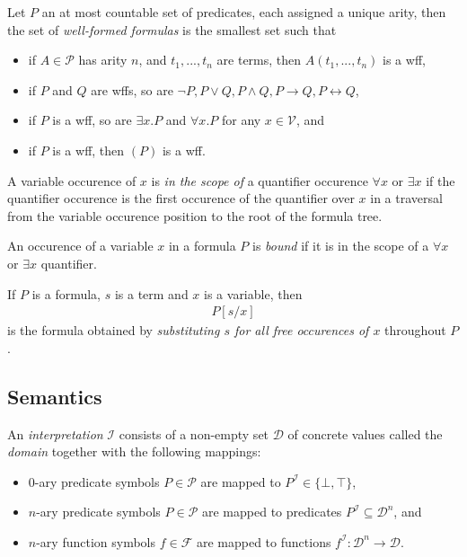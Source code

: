 \documentclass{article}
\begin{document}
\begin{definition}
	Let $P$ an at most countable set of predicates, each assigned a unique arity,
	then the set of \emph{well-formed formulas} is the smallest set such that
	\begin{itemize}
		\item if $A\in \mathcal{P}$ has arity $n$, and $t_1,...,t_n$ are terms, then $A(t_1, ..., t_n)$ is a wff,
		\item if $P$ and $Q$ are wffs, so are $\neg P,P\vee Q,P\wedge Q,P\rightarrow Q,P\leftrightarrow Q$,
		\item if $P$ is a wff, so are $\exists x. P$ and $\forall x. P$ for any $x\in \mathcal{V}$, and
		\item if $P$ is a wff, then $(P)$ is a wff.
	\end{itemize}
\end{definition}

\begin{definition}
	A variable occurence of $x$ is \emph{in the scope of} a quantifier
	occurence $\forall x$ or $\exists x$ if the quantifier occurence is
	the first occurence of the quantifier over $x$ in a traversal from the
	variable occurence position to the root of the formula tree.

	An occurence of a variable $x$ in a formula $P$ is \emph{bound} if it
	is in the scope of a $\forall x$ or $\exists x$ quantifier.
\end{definition}

\begin{definition}
	If $P$ is a formula, $s$ is a term and $x$ is a variable, then
	\begin{align*}
		P[s/x]
	\end{align*}
	is the formula obtained by \emph{substituting $s$ for all free occurences of $x$}
	throughout $P$.
\end{definition}

\subsection{Semantics}

\begin{definition}[Interpretation]
	An \emph{interpretation} $\mathcal{I}$ consists of a non-empty set $\mathcal{D}$ of concrete values
	called the \emph{domain} together with the following mappings:
	\begin{itemize}
		\item 0-ary predicate symbols $P\in\mathcal{P}$ are mapped to $P^\mathcal{I}\in\{\bot, \top\}$,
		\item $n$-ary predicate symbols $P\in\mathcal{P}$ are mapped to predicates $P^\mathcal{I}\subseteq \mathcal{D}^n$, and
		\item $n$-ary function symbols $f\in\mathcal{F}$ are mapped to functions $f^\mathcal{I}:\mathcal{D}^n\to\mathcal{D}$.
	\end{itemize}
\end{definition}
\end{document}

